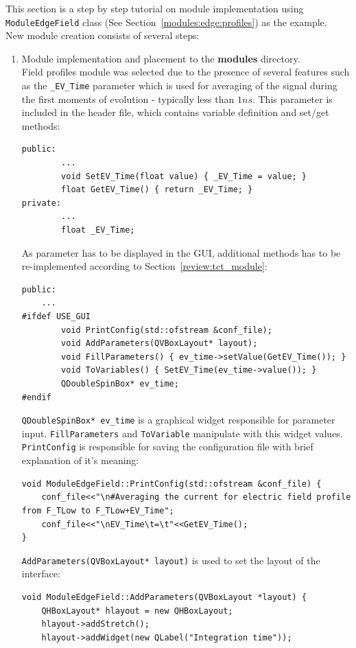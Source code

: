 \documentclass[12pt,oneside,notitlepage,abstracton,a4paper]{scrartcl}
\begin{document}
This section is a step by step tutorial on module implementation using \lstinline$ModuleEdgeField$ class (See Section~\ref{modules:edge:profiles}) as the example. 
\\ New module creation consists of several steps:
\begin{enumerate}
\item Module implementation and placement to the \textbf{modules} directory.
\\ Field profiles module was selected due to the presence of several features such as the \lstinline$_EV_Time$ parameter which is used for averaging of the signal during the first moments of evolution - typically less than $1ns$. This parameter is included in the header file, which contains variable definition and set/get methods:
\begin{lstlisting}
public:
		...
        void SetEV_Time(float value) { _EV_Time = value; }
        float GetEV_Time() { return _EV_Time; }
private:
		...
        float _EV_Time;
\end{lstlisting}
As parameter has to be displayed in the GUI, additional methods has to be re-implemented according to Section~\ref{review:tct_module}:
\begin{lstlisting}
public:
	...
#ifdef USE_GUI
        void PrintConfig(std::ofstream &conf_file);
        void AddParameters(QVBoxLayout* layout);
        void FillParameters() { ev_time->setValue(GetEV_Time()); }
        void ToVariables() { SetEV_Time(ev_time->value()); }
        QDoubleSpinBox* ev_time;
#endif
\end{lstlisting}
\lstinline$QDoubleSpinBox* ev_time$ is a graphical widget responsible for parameter input. \lstinline$FillParameters$ and \lstinline$ToVariable$ manipulate with this widget values.
\\ \lstinline$PrintConfig$ is responsible for saving the configuration file with brief explanation of it's meaning:
\begin{lstlisting}
void ModuleEdgeField::PrintConfig(std::ofstream &conf_file) {
    conf_file<<"\n#Averaging the current for electric field profile from F_TLow to F_TLow+EV_Time";
    conf_file<<"\nEV_Time\t=\t"<<GetEV_Time();
}
\end{lstlisting}
\lstinline$AddParameters(QVBoxLayout* layout)$ is used to set the layout of the interface:
\begin{lstlisting}
void ModuleEdgeField::AddParameters(QVBoxLayout *layout) {
    QHBoxLayout* hlayout = new QHBoxLayout;
    hlayout->addStretch();
    hlayout->addWidget(new QLabel("Integration time"));

\end{lstlisting}
\end{enumerate}
\end{document}
